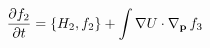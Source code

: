 \documentclass[preview]{standalone}
\begin{document}
\begin{align*}
\special{dvisvgm:raw <g id='unique000'>}\pdv{f_2}{t}=\pb{H_2}{f_2}+\int\nabla U\cdot\nabla_{\va p}\, \special{dvisvgm:raw </g>}\special{dvisvgm:raw <g id='unique001'>}f_3\special{dvisvgm:raw </g>}
\end{align*}
\end{document}
